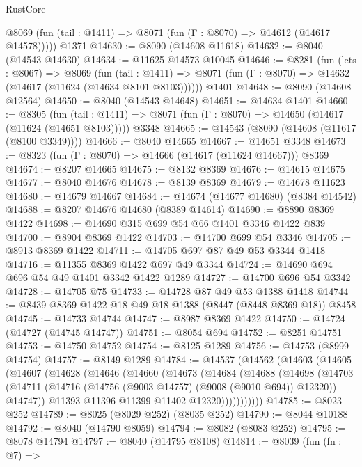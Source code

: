 \begin{lexlean}{RustCore}
\begin{coremodule}
      @8069 (fun (tail : @1411) => @8071 (fun (Γ : @8070) => @14612 (@14617 @14578)))))
    @1371
@14630 := @8090 (@14608 @11618)
@14632 := @8040 (@14543 @14630)
@14634 := @11625 @14573 @10045
@14646 := @8281
    (fun (lets : @8067) =>
    @8069
      (fun (tail : @1411) =>
      @8071 (fun (Γ : @8070) => @14632 (@14617 (@11624 (@14634 @8101 @8103))))))
    @1401
@14648 := @8090 (@14608 @12564)
@14650 := @8040 (@14543 @14648)
@14651 := @14634 @1401
@14660 := @8305
    (fun (tail : @1411) => @8071 (fun (Γ : @8070) => @14650 (@14617 (@11624 (@14651 @8103)))))
    @3348
@14665 := @14543 (@8090 (@14608 (@11617 (@8100 @3349))))
@14666 := @8040 @14665
@14667 := @14651 @3348
@14673 := @8323 (fun (Γ : @8070) => @14666 (@14617 (@11624 @14667))) @8369
@14674 := @8207 @14665
@14675 := @8132 @8369
@14676 := @14615 @14675
@14677 := @8040 @14676
@14678 := @8139 @8369
@14679 := @14678 @11623
@14680 := @14679 @14667
@14684 := @14674 (@14677 @14680) (@8384 @14542)
@14688 := @8207 @14676 @14680 (@8389 @14614)
@14690 := @8890 @8369 @1422
@14698 := @14690 @315 @699 @54 @66 @1401 @3346 @1422 @839
@14700 := @8904 @8369 @1422
@14703 := @14700 @699 @54 @3346
@14705 := @8913 @8369 @1422
@14711 := @14705 @697 @87 @49 @53 @3344 @1418
@14716 := @11355 @8369 @1422 @697 @49 @3344
@14724 := @14690 @694 @696 @54 @49 @1401 @3342 @1422 @1289
@14727 := @14700 @696 @54 @3342
@14728 := @14705 @75
@14733 := @14728 @87 @49 @53 @1388 @1418
@14744 := @8439 @8369 @1422 @18 @49 @18 @1388 (@8447 (@8448 @8369 @18)) @8458
@14745 := @14733 @14744
@14747 := @8987 @8369 @1422
@14750 := @14724 (@14727 (@14745 @14747))
@14751 := @8054 @694
@14752 := @8251 @14751
@14753 := @14750 @14752
@14754 := @8125 @1289
@14756 := @14753 (@8999 @14754)
@14757 := @8149 @1289
@14784 := @14537
    (@14562
      (@14603
        (@14605
          (@14607
            (@14628
              (@14646
                (@14660
                  (@14673
                    (@14684
                      (@14688
                        (@14698
                          (@14703
                            (@14711
                              (@14716 (@14756 (@9003 @14757) (@9008 (@9010 @694)) @12320))
                              @14747))
                          @11393
                          @11396
                          @11399
                          @11402
                          @12320)))))))))))
@14785 := @8023 @252
@14789 := @8025 (@8029 @252) (@8035 @252)
@14790 := @8044 @10188
@14792 := @8040 (@14790 @8059)
@14794 := @8082 (@8083 @252)
@14795 := @8078 @14794
@14797 := @8040 (@14795 @8108)
@14814 := @8039
    (fun (fn : @7) =>

\end{coremodule}
\end{lexlean}
